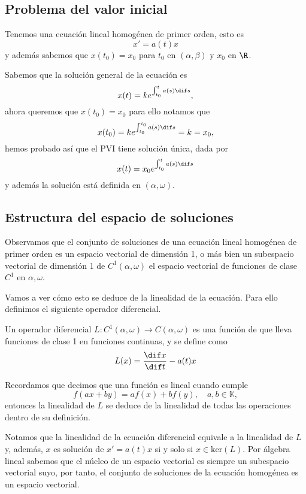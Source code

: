 \documentclass[../main.tex]{subfiles}
\begin{document}
\subsection{Problema del valor inicial}

Tenemos una ecuación lineal homogénea de primer orden, esto es
\[x' = a(t)x\]
y además sabemos que \(x(t_0) = x_0\) para \(t_0\) en \((\alpha, \beta)\) y
\(x_0\) en \(\R\).

Sabemos que la solución general de la ecuación es
\[x(t) = k e^{\int_{t_0}^t a(s) \dif s},\]
ahora queremos que \(x(t_0) = x_0\) para ello notamos que
\[x(t_0) = k e^{\int_{t_0}^{t_0} a(s) \dif s} = k = x_0,\]
hemos probado así que el PVI tiene solución única, dada por
\[x(t) = x_0 e^{\int_{t_0}^t a(s) \dif s}\]
y además la solución está definida en \((\alpha, \omega)\).

\subsection{Estructura del espacio de soluciones}

Observamos que el conjunto de soluciones de una ecuación lineal homogénea de
primer orden es un espacio vectorial de dimensión 1, o más bien un subespacio
vectorial de dimensión 1 de \(C^1(\alpha, \omega)\) el espacio vectorial de
funciones de clase \(C^1\) en \(\alpha, \omega\).

Vamos a ver cómo esto se deduce de la linealidad de la ecuación. Para ello
definimos el siguiente operador diferencial.

\begin{definition}
	Un operador diferencial \(L : C^1(\alpha, \omega) \to C(\alpha, \omega)\)
	es una función de que lleva funciones de clase 1 en funciones continuas, y
	se define como
	\[L(x) = \frac{\dif x}{\dif t} - a(t)x\]
\end{definition}

Recordamos que decimos que una función es lineal cuando cumple
\[f(ax + by) = af(x) + bf(y), \quad a, b \in \mathbb{K},\]
entonces la linealidad de \(L\) se deduce de la linealidad de todas las
operaciones dentro de su definición.

Notamos que la linealidad de la ecuación diferencial equivale a la linealidad de
\(L\) y, además, \(x\) es solución de \(x' = a(t)x\) si y solo si 
\(x \in \text{ker}(L)\). Por álgebra lineal sabemos que el núcleo de un espacio
vectorial es siempre un subespacio vectorial suyo, por tanto, el conjunto de
soluciones de la ecuación homogénea es un espacio vectorial.
\end{document}
